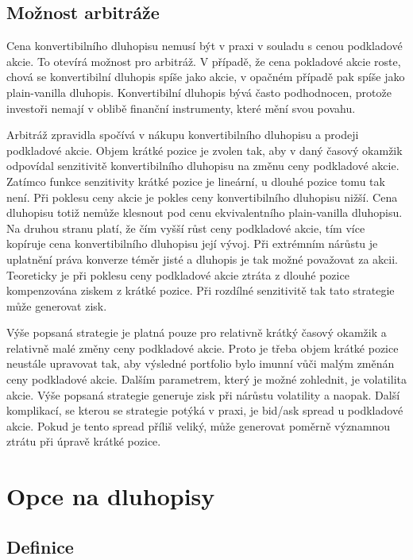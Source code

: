 \documentclass[a4paper]{book}
\begin{document}
\subsection{Možnost arbitráže}

Cena konvertibilního dluhopisu nemusí být v praxi v souladu s cenou podkladové akcie. To otevírá možnost pro arbitráž. V případě, že cena pokladové akcie roste, chová se konvertibilní dluhopis spíše jako akcie, v opačném případě pak spíše jako plain-vanilla dluhopis. Konvertibilní dluhopis bývá často podhodnocen, protože investoři nemají v oblibě finanční instrumenty, které mění svou povahu.

Arbitráž zpravidla spočívá v nákupu konvertibilního dluhopisu a prodeji podkladové akcie. Objem krátké pozice je zvolen tak, aby v daný časový okamžik odpovídal senzitivitě konvertibilního dluhopisu na změnu ceny podkladové akcie. Zatímco funkce senzitivity krátké pozice je lineární, u dlouhé pozice tomu tak není. Při poklesu ceny akcie je pokles ceny konvertibilního dluhopisu nižší. Cena dluhopisu totiž nemůže klesnout pod cenu ekvivalentního plain-vanilla dluhopisu. Na druhou stranu platí, že čím vyšší růst ceny podkladové akcie, tím více kopíruje cena konvertibilního dluhopisu její vývoj. Při extrémním nárůstu je uplatnění práva konverze téměr jisté a dluhopis je tak možné považovat za akcii. Teoreticky je při poklesu ceny podkladové akcie ztráta z dlouhé pozice kompenzována ziskem z krátké pozice. Při rozdílné senzitivitě tak tato strategie může generovat zisk.

Výše popsaná strategie je platná pouze pro relativně krátký časový okamžik a relativně malé změny ceny podkladové akcie. Proto je třeba objem krátké pozice neustále upravovat tak, aby výsledné portfolio bylo imunní vůči malým změnán ceny podkladové akcie. Dalším parametrem, který je možné zohlednit, je volatilita akcie. Výše popsaná strategie generuje zisk při nárůstu volatility a naopak. Další komplikací, se kterou se strategie potýká v praxi, je bid/ask spread u podkladové akcie. Pokud je tento spread příliš veliký, může generovat poměrně významnou ztrátu při úpravě krátké pozice.

\section{Opce na dluhopisy}

\subsection{Definice}
\end{document}
